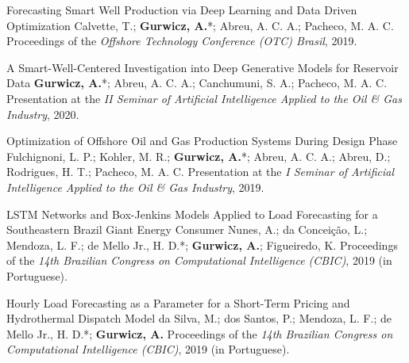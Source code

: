 \cvpublication
    {Forecasting Smart Well Production via Deep Learning and Data Driven Optimization}
    {Calvette, T.; \textbf{Gurwicz, A.}*; Abreu, A. C. A.; Pacheco, M. A. C.}
    {Proceedings of the \textit{Offshore Technology Conference (OTC) Brasil}, 2019. }

\cvpublication
    {A Smart-Well-Centered Investigation into Deep Generative Models for Reservoir Data}
    {\textbf{Gurwicz, A.}*; Abreu, A. C. A.; Canchumuni, S. A.; Pacheco, M. A. C.}
    {Presentation at the \textit{II Seminar of Artificial Intelligence Applied to the Oil \& Gas Industry}, 2020.}

\cvpublication
    {Optimization of Offshore Oil and Gas Production Systems During Design Phase}
    {Fulchignoni, L. P.; Kohler, M. R.; \textbf{Gurwicz, A.}*; Abreu, A. C. A.; Abreu, D.; Rodrigues, H. T.;
    Pacheco, M. A. C.}
    {Presentation at the \textit{I Seminar of Artificial Intelligence Applied to the Oil \& Gas Industry}, 2019.}

\cvpublication
    {LSTM Networks and Box-Jenkins Models Applied to Load Forecasting for a Southeastern Brazil Giant Energy Consumer}
    {Nunes, A.; da Conceição, L.; Mendoza, L. F.; de Mello Jr., H. D.*; \textbf{Gurwicz, A.}; Figueiredo, K.}
    {Proceedings of the \textit{14th Brazilian Congress on Computational Intelligence (CBIC)}, 2019 (in Portuguese).
    }

\cvpublication
    {Hourly Load Forecasting as a Parameter for a Short-Term Pricing and Hydrothermal Dispatch Model}
    {da Silva, M.; dos Santos, P.; Mendoza, L. F.; de Mello Jr., H. D.*; \textbf{Gurwicz, A.}}
    {Proceedings of the \textit{14th Brazilian Congress on Computational Intelligence (CBIC)}, 2019 (in Portuguese).
    }
